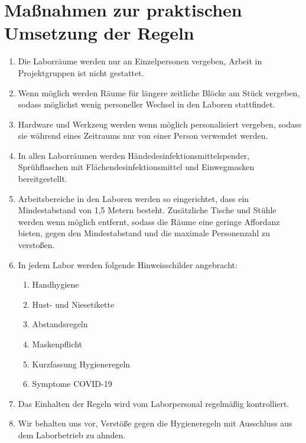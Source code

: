 \section{Maßnahmen zur praktischen Umsetzung der Regeln}

\begin{enumerate}
    \item Die Laborräume werden nur an Einzelpersonen vergeben, Arbeit in Projektgruppen ist nicht gestattet.
    \item Wenn möglich werden Räume für längere zeitliche Blöcke am Stück vergeben, sodass möglichst wenig personeller Wechsel in den Laboren stattfindet.
    \item Hardware und Werkzeug werden wenn möglich personalisiert vergeben, sodass sie während eines Zeitraums nur von einer Person verwendet werden.
    \item In allen Laborräumen werden Händedesinfektionsmittelspender, Sprühflaschen mit Flächendesinfektionsmittel und Einwegmasken bereitgestellt.
    \item Arbeitsbereiche in den Laboren werden so eingerichtet, dass ein Mindestabstand von 1,5 Metern besteht. Zusätzliche Tische und Stühle werden wenn möglich entfernt, sodass die Räume eine geringe Affordanz bieten, gegen den Mindestabstand und die maximale Personenzahl zu verstoßen.
    \item In jedem Labor werden folgende Hinweisschilder angebracht:
    \begin{enumerate}
        \item Handhygiene
        \item Hust- und Niesetikette
        \item Abstandsregeln
        \item Maskenpflicht
        \item Kurzfassung Hygieneregeln
        \item Symptome COVID-19
    \end{enumerate}
    \item Das Einhalten der Regeln wird vom Laborpersonal regelmäßig kontrolliert.
    \item Wir behalten uns vor, Verstöße gegen die Hygieneregeln mit Ausschluss aus dem Laborbetrieb zu ahnden.
\end{enumerate}
